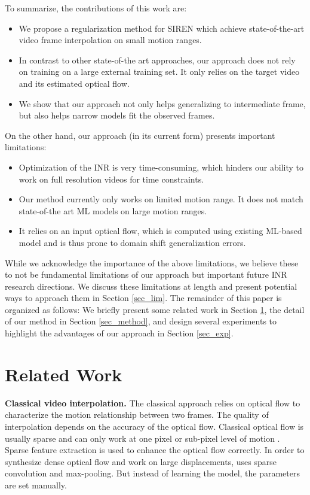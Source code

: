 \documentclass{article}
\begin{document}
To summarize, the contributions of this work are:
\begin{itemize}
\item We propose a regularization method for SIREN which achieve state-of-the-art video frame interpolation on small motion ranges.
\item In contrast to other state-of-the art approaches, our approach does not rely on training on a large external training set.
It only relies on the target video and its estimated optical flow.
\item We show that our approach not only helps generalizing to intermediate frame,
but also helps narrow models fit the observed frames.
\end{itemize}

On the other hand, our approach (in its current form) presents important limitations:

\begin{itemize}
\item Optimization of the INR is very time-consuming, which hinders our ability to work on full resolution videos for time constraints.
\item Our method currently only works on limited motion range. It does not match state-of-the art ML models on large motion ranges.
\item It relies on an input optical flow, which is computed using existing ML-based model and is thus prone to domain shift generalization errors.
\end{itemize}

While we acknowledge the importance of the above limitations,
we believe these to not be fundamental limitations of our approach but important future INR research directions.
We discuss these limitations at length and present potential ways to approach them in Section \ref{sec_lim}.
The remainder of this paper is organized as follows:
We briefly present some related work in Section \ref{sec_related}, the detail of our method in Section \ref{sec_method},
and design several experiments to highlight the advantages of our approach in Section \ref{sec_exp}.

\section{Related Work}
\label{sec_related}
\textbf{Classical video interpolation.}
The classical approach relies on optical flow to characterize the motion relationship between two frames.
The quality of interpolation depends on the accuracy of the optical flow.
Classical optical flow is usually sparse and can only work at one pixel or sub-pixel level of motion \cite{chen2012real}.
Sparse feature extraction \cite{liu2008sift} is used to enhance the optical flow correctly.
In order to synthesize dense optical flow and work on large displacements, \cite{weinzaepfel2013deepflow} uses sparse convolution and max-pooling.
But instead of learning the model, the parameters are set manually.
\end{document}
